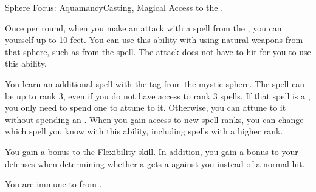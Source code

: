     \begin{magicalfeat}{Sphere Focus: Aquamancy}{Casting, Magical}
        \featpre Access to the  .

         Once per round, when you make an attack with a spell from the  , you can  yourself up to 10 feet.
        You can use this ability with  using natural weapons from that sphere, such as from the  spell.
        The attack does not have to hit for you to use this ability.

         You learn an additional spell with the  tag from the  mystic sphere.
        The spell can be up to rank 3, even if you do not have access to rank 3 spells.
        If that spell is a , you only need to spend one  to attune to it.
        Otherwise, you can attune to it without spending an .
        When you gain access to new spell ranks, you can change which spell you know with this ability, including spells with a higher rank.

         You gain a  bonus to the Flexibility skill.
        In addition, you gain a  bonus to your defenses when determining whether a  gets a  against you instead of a normal hit.

         You are immune to  from .
    \end{magicalfeat}

